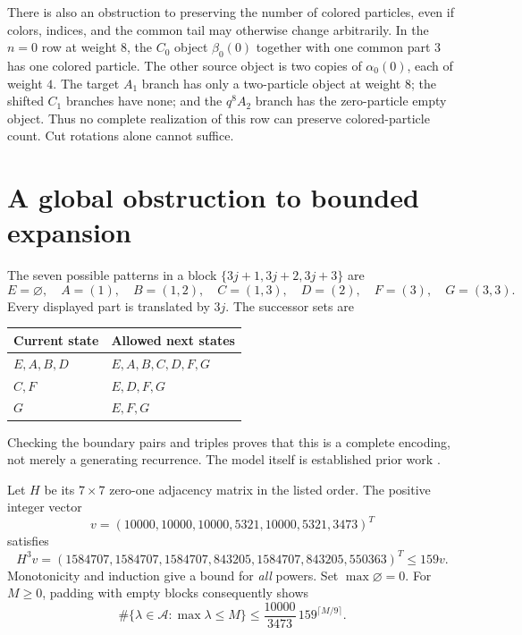 \documentclass[11pt,a4paper]{article}
\theoremstyle{definition}
\renewcommand{\AA}{\mathcal A}
\begin{document}
There is also an obstruction to preserving the number of colored particles,
even if colors, indices, and the common tail may otherwise change arbitrarily.
In the $n=0$ row at weight $8$, the $C_0$ object $\beta_0(0)$ together with
one common part $3$ has one colored particle. The other source object is
two copies of $\alpha_0(0)$, each of weight $4$.
The target $A_1$ branch has only a two-particle object at weight $8$;
the shifted $C_1$ branches have none; and the $q^8A_2$ branch has the
zero-particle empty object. Thus no complete realization of this row can
preserve colored-particle count. Cut rotations alone cannot suffice.

\section{A global obstruction to bounded expansion}

The seven possible patterns in a block $\{3j+1,3j+2,3j+3\}$ are
\[
E=\varnothing,\quad A=(1),\quad B=(1,2),\quad C=(1,3),\quad
D=(2),\quad F=(3),\quad G=(3,3).
\]
Every displayed part is translated by $3j$. The successor sets are
\begin{center}
\begin{tabular}{ll}
\toprule
Current state&Allowed next states\\\midrule
$E,A,B,D$&$E,A,B,C,D,F,G$\\
$C,F$&$E,D,F,G$\\
$G$&$E,F,G$\\\bottomrule
\end{tabular}
\end{center}
Checking the boundary pairs and triples proves that this is a complete
encoding, not merely a generating recurrence. The model itself is established
prior work \cite{chernli}.

Let $H$ be its $7\times7$ zero-one adjacency matrix in the listed order.
The positive integer vector
\[
v=(10000,10000,10000,5321,10000,5321,3473)^T
\]
satisfies
\[
H^3v=(1584707,1584707,1584707,843205,1584707,843205,550363)^T
\le159v.
\]
Monotonicity and induction give a bound for \emph{all} powers.
Set $\max\varnothing=0$. For $M\ge0$, padding with empty blocks consequently shows
\begin{equation}\label{eq:gapcount}
\#\{\lambda\in\AA:\max\lambda\le M\}
\le \frac{10000}{3473}\,159^{\lceil M/9\rceil}.
\end{equation}
\end{document}
